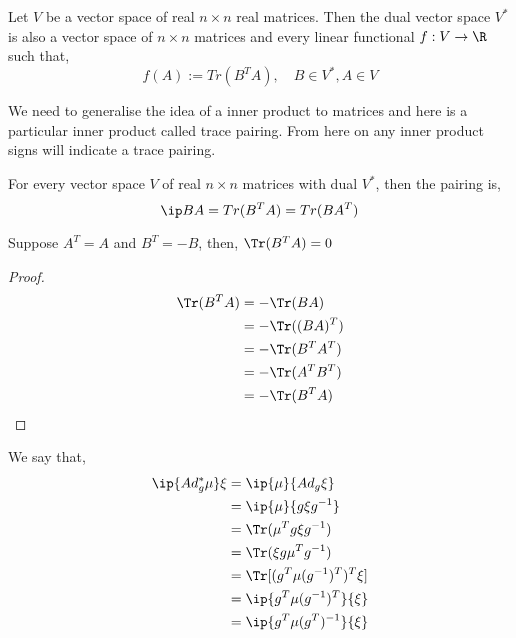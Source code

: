 \begin{nlemma}
  Let $V$ be a vector space of real $n \times n$ real matrices. Then the dual vector space $V^*$ is also a vector space of $n \times n$ matrices and every linear functional $f : V \to \R$ such that,
  $$ f(A) := Tr(B^TA), \quad B \in V^*, A \in V  $$
\end{nlemma}

We need to generalise the idea of a inner product to matrices and here is a particular inner product called  trace pairing. From here on any inner product signs will indicate a trace pairing.

\begin{ndefi}
  For every vector space $V$ of real $n\times n$ matrices with dual $V^*$, then the pairing is,
  $$ \ip B A = Tr(B^TA) = Tr(BA^T) $$
\end{ndefi}

\begin{nprop}
  Suppose $A^T = A$ and $B^T = -B$, then, $\Tr(B^TA) = 0$
\end{nprop}
\begin{proof}
  \begin{align*}
    \Tr(B^TA) &= -\Tr(BA)\\
    &= -\Tr((BA)^T)\\
    &= -\Tr(B^TA^T)\\
    &= -\Tr(A^TB^T)\\
    &= - \Tr(B^TA)
  \end{align*}
\end{proof}

We say that,
\begin{align*}
  \ip {Ad^*_g \mu} \xi &= \ip {\mu} {Ad_g\xi}\\
  &= \ip {\mu} {g\xi g^{-1}}\\
  &= \Tr(\mu^Tg\xi g^{-1})\\
  &= \Tr(\xi g\mu^Tg^{-1})\\
  &= \Tr [(g^T\mu(g^{-1})^T)^T\xi]\\
  &= \ip{g^T\mu (g^{-1})^T} {\xi}\\
  &= \ip{g^T\mu (g^T)^{-1}} {\xi}\\
\end{align*}
